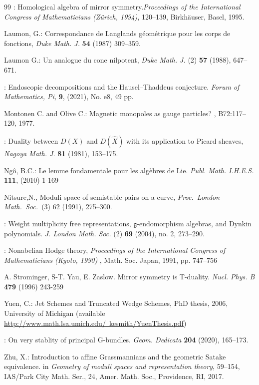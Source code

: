 \documentclass[12pt]{article}
\numberwithin{equation}{section}
\theoremstyle{remark}
\numberwithin{theorem}{section}
\numberwithin{equation}{section}
\begin{document}
\begin{thebibliography}{99}
: Homological algebra of mirror symmetry.{\em  Proceedings of the International Congress of Mathematicians (Z\"urich, 1994)}, 120--139, Birkh\"auser, Basel, 1995.
	
		 { Laumon, G.}: Correspondance de Langlands g\'eom\'etrique pour les corps de fonctions, {\em Duke Math. J.} {\bf 54}
(1987) 309--359.
	
	 { Laumon G.}: Un analogue du cone nilpotent,
{\em Duke Math. J.} (2) {\bf 57} (1988), 647--671. 

	
	
	: Endoscopic decompositions and the Hausel--Thaddeus conjecture. {\em Forum of Mathematics, Pi,} {\bf 9}, (2021),  No. e8, 49 pp. 	%
	
Montonen C. and Olive C.:
\newblock Magnetic monopoles as gauge particles?
, B72:117--120, 1977.
	
	:
	Duality between $D(X)$ and $D(\hat{X} )$ with its application to Picard sheaves,
	{\em Nagoya Math. J.} {\bf 81} (1981), 153--175.
	
	 { Ng\^o, B.C.}: Le lemme fondamentale pour les algèbres de Lie. {\em 
		Publ. Math. I.H.E.S.} {\bf 111}, (2010) 1-169
	
{  Nitsure,N.},
Moduli space of semistable pairs on a curve,
{\em Proc.\ London Math.\ Soc.\ }(3) 62 (1991), 275--300.
	
	:
	Weight multiplicity free representations, {$\mathfrak g$}-endomorphism algebras, and Dynkin polynomials.
	{\em 	J. London Math. Soc.} (2) {\bf 69 }(2004), no. 2, 273--290.
	
		
	: Nonabelian Hodge theory, {\em Proceedings of the International Congress of Mathematicians (Kyoto, 1990)} , Math. Soc. Japan, 1991, pp. 747–756
	
	 A. Strominger, S-T. Yau, E. Zaslow. 
	Mirror symmetry is T-duality. {\em Nucl. Phys. B} {\bf 479} (1996) 243-259
	
	 { Yuen, C.}: Jet Schemes and Truncated Wedge Schemes, PhD thesis, 2006, University of Michigan (available \href{http://www.math.lsa.umich.edu/~kesmith/YuenThesis.pdf}{http://www.math.lsa.umich.edu/~kesmith/YuenThesis.pdf})
	
	:
	On very stablity of principal G-bundles. 
	{\em 	Geom. Dedicata} {\bf 204} (2020), 165--173.

 Zhu, X.: Introduction to affine Grassmannians and the geometric Satake equivalence. {in {\em Geometry of moduli spaces and representation theory}}, 59--154, IAS/Park City Math. Ser., 24, Amer. Math. Soc., Providence, RI, 2017.

\end{thebibliography}
\end{document}
